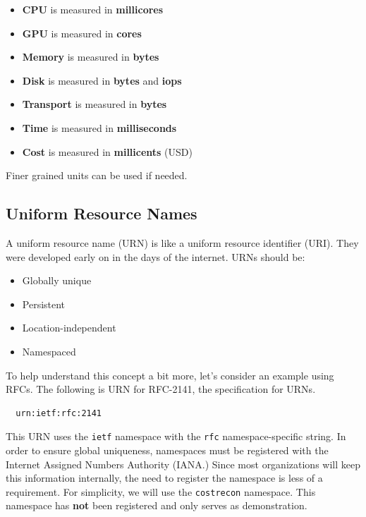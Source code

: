 \documentclass[10pt, a4paper, twocolumn]{article}
\begin{document}
    \begin{itemize}
      \item \textbf{CPU} is measured in \textbf{millicores}
      \item \textbf{GPU} is measured in \textbf{cores}
      \item \textbf{Memory} is measured in \textbf{bytes}
      \item \textbf{Disk} is measured in \textbf{bytes} and \textbf{iops}
      \item \textbf{Transport} is measured in \textbf{bytes}
      \item \textbf{Time} is measured in \textbf{milliseconds}
      \item \textbf{Cost} is measured in \textbf{millicents} (USD)
    \end{itemize}

    Finer grained units can be used if needed.

  \subsection*{Uniform Resource Names}
    A uniform resource name (URN) is like a uniform resource identifier (URI).
    They were developed early on in the days of the internet.
    URNs should be:

    \begin{itemize}
      \item Globally unique
      \item Persistent
      \item Location-independent
      \item Namespaced
    \end{itemize}

    To help understand this concept a bit more, let's consider an example using RFCs.
    The following is URN for RFC-2141, the specification for URNs.

\begin{verbatim}
  urn:ietf:rfc:2141
\end{verbatim}

    This URN uses the \texttt{ietf} namespace with the \texttt{rfc} namespace-specific string.
    In order to ensure global uniqueness, namespaces must be registered with the Internet Assigned Numbers Authority (IANA.)
    Since most organizations will keep this information internally, the need to register the namespace is less of a requirement.
    For simplicity, we will use the \texttt{costrecon} namespace.
    This namespace has \textbf{not} been registered and only serves as demonstration.
\end{document}
